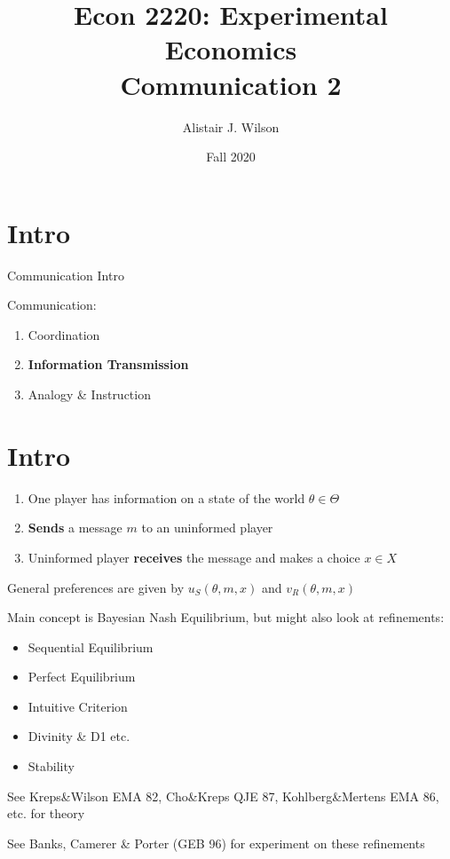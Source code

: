 \documentclass{beamer}
\begin{document}
\section{Intro}
\title{\LARGE Econ 2220: Experimental Economics \\ Communication 2}
\author{Alistair J. Wilson }
\date{Fall 2020}
 \maketitle

\begin{frame}{Communication Intro}
	\begin{card}
	Communication:
		\begin{enumerate}
			\item Coordination
			\item \textbf{Information Transmission}
			\item Analogy \& Instruction
		\end{enumerate}
	\end{card}
\end{frame}
\section{Intro}
\begin{frame}
	\begin{card}
			\begin{enumerate}
				\item One player has information on a state of the world $\theta\in\Theta$
				\item \textbf{Sends} a message $m$ to an uninformed player
				\item Uninformed player \textbf{receives} the message and makes a choice $x\in X$ 
			\end{enumerate}
\end{card}
\pause
\begin{card}	
		General preferences are given by $u_S(\theta,m,x)$ and $v_R(\theta,m,x)$
	\end{card}
\end{frame}

\begin{frame}
	\begin{card}
Main concept is Bayesian Nash Equilibrium, but might also look at refinements:
		\begin{itemize}
			\item Sequential Equilibrium
			\item Perfect Equilibrium
			\item Intuitive Criterion
			\item Divinity \& D1 etc.
			\item Stability
		\end{itemize}
\end{card}
		\pause
\begin{card}
See Kreps\&Wilson EMA 82, Cho\&Kreps QJE 87, Kohlberg\&Mertens EMA 86, etc. for theory

See Banks, Camerer \& Porter (GEB 96) for experiment on these refinements
\end{card}
\end{frame}
\end{document}
